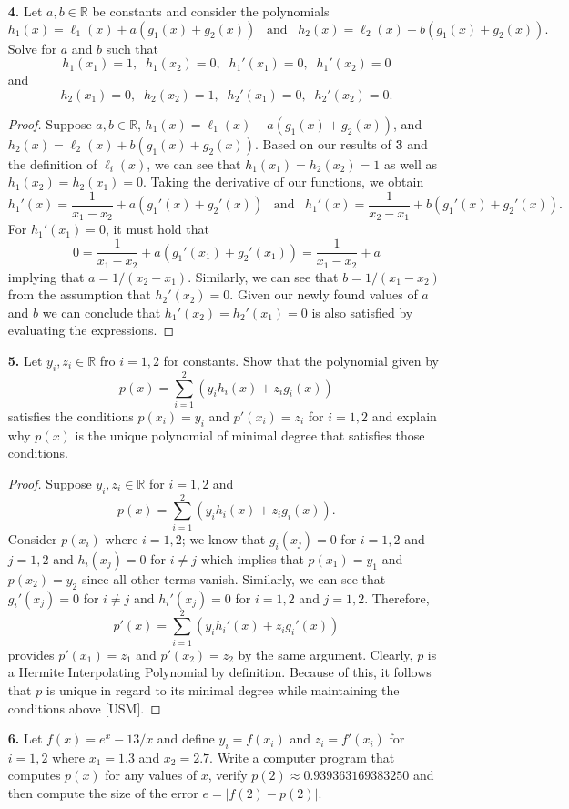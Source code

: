 \documentclass[ 12pt ]{article}
\begin{document}
\begin{enumerate}
	\item[\textbf{4.}] Let $a, b \in \mathbb{R}$ be constants and consider the polynomials $$h_1(x) = \ell_1(x) + a(g_1(x) + g_2(x))\;\;\; \mathrm{and}\;\;\; h_2(x) = \ell_2(x) + b(g_1(x) + g_2(x)).$$ Solve for $a$ and $b$ such that $$h_1(x_1) = 1,\;\; h_1(x_2) = 0,\;\; h_1'(x_1) = 0,\;\; h_1'(x_2) = 0$$ and $$h_2(x_1) = 0,\;\; h_2(x_2) = 1,\;\; h_2'(x_1) = 0,\;\; h_2'(x_2) = 0.$$

	\begin{proof}
		Suppose $a, b \in \mathbb{R}$, $h_1(x) = \ell_1(x) + a(g_1(x) + g_2(x))$, and $h_2(x) = \ell_2(x) + b(g_1(x) + g_2(x))$. Based on our results of \textbf{3} and the definition of $\ell_i(x)$, we can see that $h_1(x_1) = h_2(x_2) = 1$ as well as $h_1(x_2) = h_2(x_1) = 0$. Taking the derivative of our functions, we obtain $$h_1'(x) = \frac{1}{x_1 - x_2} + a(g_1'(x) + g_2'(x))\;\;\; \mathrm{and}\;\;\; h_1'(x) = \frac{1}{x_2 - x_1} + b(g_1'(x) + g_2'(x)).$$ For $h_1'(x_1) = 0$, it must hold that $$0 = \frac{1}{x_1 - x_2} + a(g_1'(x_1) + g_2'(x_1)) = \frac{1}{x_1 - x_2} + a$$ implying that $a = 1/(x_2 - x_1)$. Similarly, we can see that $b = 1 / (x_1 - x_2)$ from the assumption that $h_2'(x_2) = 0$. Given our newly found values of $a$ and $b$ we can conclude that $h_1'(x_2) = h_2'(x_1) = 0$ is also satisfied by evaluating the expressions.
	\end{proof}

	\item[\textbf{5.}] Let $y_i, z_i \in \mathbb{R}$ fro $i = 1, 2$ for constants. Show that the polynomial given by $$p(x) = \sum_{i=1}^2 \left ( y_i h_i(x) + z_i g_i(x) \right )$$ satisfies the conditions $p(x_i) = y_i$ and $p'(x_i) = z_i$ for $i = 1, 2$ and explain why $p(x)$ is the unique polynomial of minimal degree that satisfies those conditions.

	\begin{proof}
		Suppose $y_i, z_i \in \mathbb{R}$ for $i = 1, 2$ and $$p(x) = \sum_{i = 1}^2 ( y_i h_i(x) + z_i g_i(x) ).$$ Consider $p(x_i)$ where $i = 1, 2$; we know that $g_i(x_j) = 0$ for
		$i = 1, 2$ and $j = 1, 2$ and $h_i(x_j) = 0$ for $i \neq j$ which implies that $p(x_1) = y_1$ and $p(x_2) = y_2$ since all other terms vanish. Similarly, we can see that
		$g_i'(x_j) = 0$ for $i \neq j$ and $h_i'(x_j) = 0$ for $i = 1, 2$ and $j = 1, 2$. Therefore, $$p'(x) = \sum_{i = 1}^2 ( y_i h_i'(x) + z_i g_i'(x) )$$ provides $p'(x_1) = z_1$
		and $p'(x_2) = z_2$ by the same argument. Clearly, $p$ is a Hermite Interpolating Polynomial by definition. Because of this, it follows that $p$ is unique in regard to its minimal
		degree while maintaining the conditions above [USM].
	\end{proof}

	\item[\textbf{6.}] Let $f(x) = e^x - 13 / x$ and define $y_i = f(x_i)$ and $z_i = f'(x_i)$ for $i = 1, 2$ where $x_1 = 1.3$ and $x_2 = 2.7$. Write a computer program that computes $p(x)$ for any values of $x$, verify $p(2) \approx 0.939363169383250$ and then compute the size of the error $e = |f(2) - p(2)|$.
\end{enumerate}
\end{document}
